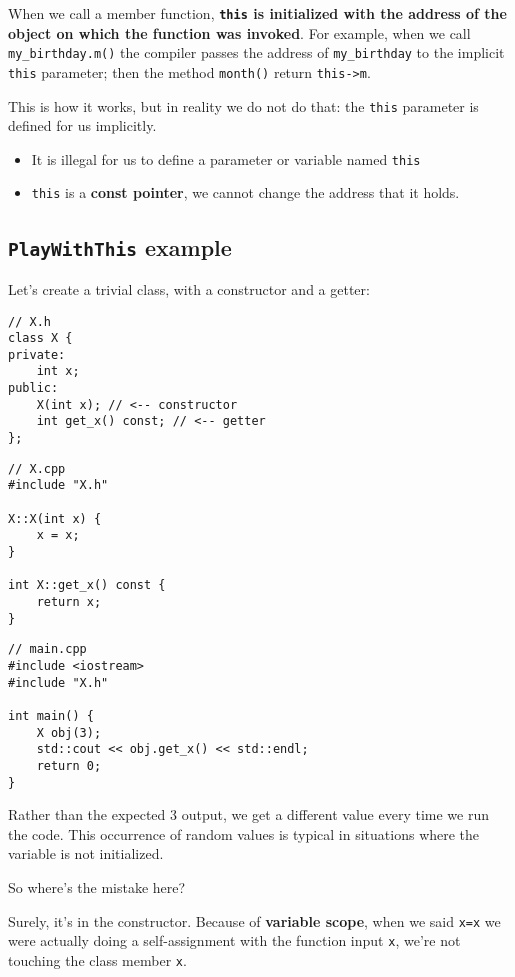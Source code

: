 When we call a member function, \textbf{\texttt{this} is initialized with the address of the object on which the function was invoked}. For example, when we call \lstinline|my_birthday.m()| the compiler passes the address of \texttt{my\_birthday} to the implicit \texttt{this} parameter; then the method \texttt{month()} return \texttt{this->m}.


This is how it works, but in reality we do not do that: the \texttt{this} parameter is defined for us implicitly.

\begin{marker}
\begin{itemize}
    \item It is illegal for us to define a parameter or variable named \texttt{this}
    \item \texttt{this} is a \textbf{const pointer}, we cannot change the address that it holds.
\end{itemize}
\end{marker}

\subsection*{\texttt{PlayWithThis} example}

Let's create a trivial class, with a constructor and a getter:
\begin{lstlisting}
// X.h
class X {
private:
    int x;
public:
    X(int x); // <-- constructor
    int get_x() const; // <-- getter
};
\end{lstlisting}
\begin{lstlisting}
// X.cpp
#include "X.h"

X::X(int x) {
    x = x;
}

int X::get_x() const {
    return x;
}
\end{lstlisting}
\begin{lstlisting}
// main.cpp
#include <iostream>
#include "X.h"

int main() {
    X obj(3);
    std::cout << obj.get_x() << std::endl;
    return 0;
}
\end{lstlisting}

Rather than the expected 3 output, we get a different value every time we run the code. This occurrence of random values is typical in situations where the variable is not initialized.

So where’s the mistake here?

Surely, it's in the constructor. Because of \textbf{variable scope}, when we said \texttt{x=x} we were actually doing a self-assignment with the function input \texttt{x}, we're not touching the class member \texttt{x}.

